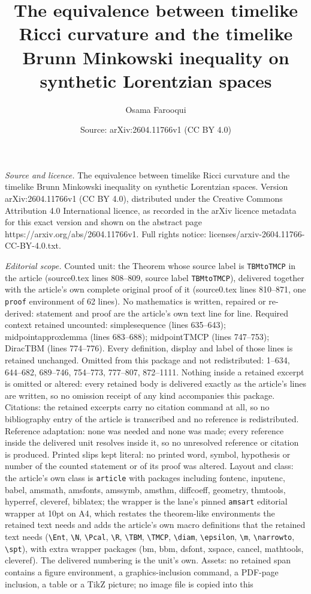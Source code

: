\documentclass[10pt,a4paper]{amsart}
\title[The equivalence between timelike Ricci curvature and the tim]{The equivalence between timelike Ricci curvature and the timelike Brunn Minkowski inequality on synthetic Lorentzian spaces}
\author{Osama Farooqui}
\date{Source: arXiv:2604.11766v1 (CC BY 4.0)}
\begin{document}
\maketitle

\noindent\emph{Source and licence.} The equivalence between timelike Ricci curvature and the timelike Brunn Minkowski inequality on synthetic Lorentzian spaces. Version arXiv:2604.11766v1 (CC BY 4.0), distributed under the Creative Commons Attribution 4.0 International licence, as recorded in the arXiv licence metadata for this exact version and shown on the abstract page https://arxiv.org/abs/2604.11766v1. Full rights notice: licenses/arxiv-2604.11766-CC-BY-4.0.txt.\par\smallskip

\noindent\textit{Editorial scope.} Counted unit: the Theorem whose source label is \texttt{TBMtoTMCP} in the article (source0.tex lines 808--809, source label \texttt{TBMtoTMCP}), delivered together with the article's own complete original proof of it (source0.tex lines 810--871, one \texttt{proof} environment of 62 lines). No mathematics is written, repaired or re-derived: statement and proof are the article's own text line for line. Required context retained uncounted: simplesequence (lines 635--643); midpointapproxlemma (lines 683--688); midpointTMCP (lines 747--753); DiracTBM (lines 774--776). Every definition, display and label of those lines is retained unchanged. Omitted from this package and not redistributed: 1--634, 644--682, 689--746, 754--773, 777--807, 872--1111. Nothing inside a retained excerpt is omitted or altered: every retained body is delivered exactly as the article's lines are written, so no omission receipt of any kind accompanies this package. Citations: the retained excerpts carry no citation command at all, so no bibliography entry of the article is transcribed and no reference is redistributed. Reference adaptation: none was needed and none was made; every reference inside the delivered unit resolves inside it, so no unresolved reference or citation is produced. Printed slips kept literal: no printed word, symbol, hypothesis or number of the counted statement or of its proof was altered. Layout and class: the article's own class is \texttt{article} with packages including fontenc, inputenc, babel, amsmath, amsfonts, amssymb, amsthm, diffcoeff, geometry, thmtools, hyperref, cleveref, biblatex; the wrapper is the lane's pinned \texttt{amsart} editorial wrapper at 10pt on A4, which restates the theorem-like environments the retained text needs and adds the article's own macro definitions that the retained text needs (\texttt{\textbackslash Ent}, \texttt{\textbackslash N}, \texttt{\textbackslash Pcal}, \texttt{\textbackslash R}, \texttt{\textbackslash TBM}, \texttt{\textbackslash TMCP}, \texttt{\textbackslash diam}, \texttt{\textbackslash epsilon}, \texttt{\textbackslash m}, \texttt{\textbackslash narrowto}, \texttt{\textbackslash spt}), with extra wrapper packages (bm, bbm, dsfont, xspace, cancel, mathtools, cleveref). The delivered numbering is the unit's own. Assets: no retained span contains a figure environment, a graphics-inclusion command, a PDF-page inclusion, a table or a TikZ picture; no image file is copied into this 
\end{document}
